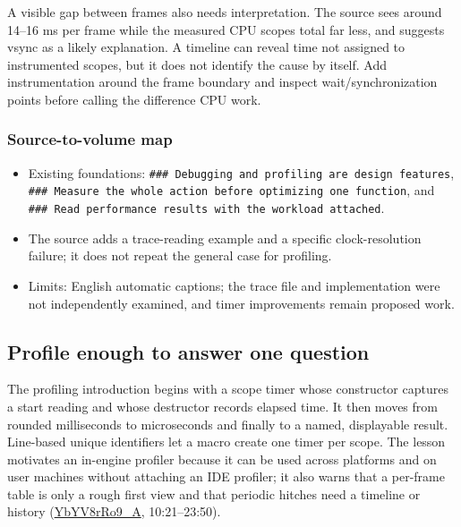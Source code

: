 A visible gap between frames also needs interpretation. The source sees around 14--16 ms per frame while the measured CPU scopes total far less, and suggests vsync as a likely explanation. A timeline can reveal time not assigned to instrumented scopes, but it does not identify the cause by itself. Add instrumentation around the frame boundary and inspect wait/synchronization points before calling the difference CPU work.

\subsubsection{Source-to-volume map}\label{06-engine-ii-ch041-source-to-volume-map-1}

\begin{itemize}
\tightlist
\item
  Existing foundations: \texttt{\#\#\#\ Debugging\ and\ profiling\ are\ design\ features}, \texttt{\#\#\#\ Measure\ the\ whole\ action\ before\ optimizing\ one\ function}, and \texttt{\#\#\#\ Read\ performance\ results\ with\ the\ workload\ attached}.
\item
  The source adds a trace-reading example and a specific clock-resolution failure; it does not repeat the general case for profiling.
\item
  Limits: English automatic captions; the trace file and implementation were not independently examined, and timer improvements remain proposed work.
\end{itemize}

\subsection{Profile enough to answer one question}\label{06-engine-ii-ch041-profile-enough-to-answer-one-question}

The profiling introduction begins with a scope timer whose constructor captures a start reading and whose destructor records elapsed time. It then moves from rounded milliseconds to microseconds and finally to a named, displayable result. Line-based unique identifiers let a macro create one timer per scope. The lesson motivates an in-engine profiler because it can be used across platforms and on user machines without attaching an IDE profiler; it also warns that a per-frame table is only a rough first view and that periodic hitches need a timeline or history (\href{https://www.youtube.com/watch?v=YbYV8rRo9_A}{YbYV8rRo9\_A}, 10:21--23:50).

